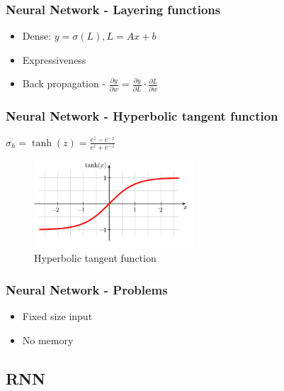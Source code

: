 \documentclass[12pt]{report}
\begin{document}
\newpage
\subsubsection{Neural Network - Layering functions}

\begin{itemize}
	\item Dense: $y = \sigma(L), L = Ax+b$
	\item Expressiveness 
	\item Back propagation - $\frac{\partial y}{ \partial w} =  \frac{\partial y}{ \partial L} \cdot \frac{\partial L}{ \partial w}$
\end{itemize}


\subsubsection{Neural Network - Hyperbolic tangent  function}
$\sigma_h = \tanh(z) = \frac{e^z-e^{-z}}{e^z+e^{-z}}$
\begin{figure}[H]\centering\includegraphics[width=6cm]{tanh.png}\caption{Hyperbolic tangent function}\end{figure}


\subsubsection{Neural Network - Problems}


\begin{itemize}
	\item Fixed size input
	\item No memory
\end{itemize}


\newpage
\subsection{RNN}
\end{document}

